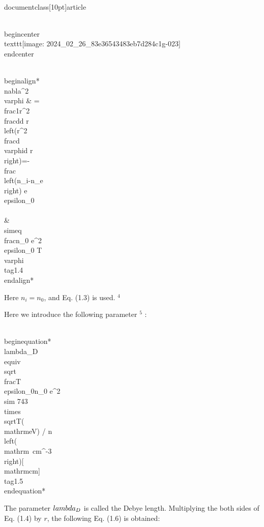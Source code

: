\\documentclass[10pt]{article}
\begin{document}
\\begin{center}
\\texttt{[image: 2024\_02\_26\_83e36543483eb7d284c1g-023]}
\\end{center}


\\begin{align*}
\\nabla^{2} \\varphi & =\\frac{1}{r^{2}} \\frac{d}{d r}\\left(r^{2} \\frac{d \\varphi}{d r}\\right)=-\\frac{\\left(n_{i}-n_{e}\\right) e}{\\epsilon_{0}} \\\\
& \\simeq \\frac{n_{0} e^{2}}{\\epsilon_{0} T} \\varphi \\tag{1.4}
\\end{align*}


Here $n_{i}=n_{0}$, and Eq. (1.3) is used. ${ }^{4}$

Here we introduce the following parameter ${ }^{5}$ :


\\begin{equation*}
\\lambda_{D} \\equiv \\sqrt{\\frac{T \\epsilon_{0}}{n_{0} e^{2}}} \\sim 743 \\times \\sqrt{T(\\mathrm{eV}) / n\\left(\\mathrm{~cm}^{-3}\\right)}[\\mathrm{cm}] \\tag{1.5}
\\end{equation*}


The parameter $\\lambda_{D}$ is called the Debye length. Multiplying the both sides of Eq. (1.4) by $r$, the following Eq. (1.6) is obtained:
\end{document}
